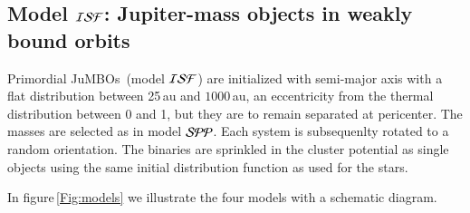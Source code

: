 \documentclass[submission,phys]{lib/SciPost}
\newcommand{\jumbos}{\mbox{JuMBOs}}
\begin{document}
\subsection{Model ${\cal ISF}$: Jupiter-mass objects in weakly bound orbits}

Primordial \jumbos\, (model ${\cal ISF}$) are initialized with
semi-major axis with a flat distribution between 25\,au and
$1000$\,au, an eccentricity from the thermal distribution between 0
and 1, but they are to remain separated at pericenter.  The masses are
selected as in model ${\cal SPP}$.  Each system is subsequenlty
rotated to a random orientation.  The binaries are sprinkled in the
cluster potential as single objects using the same initial
distribution function as used for the stars.


In figure\,\ref{Fig:models} we illustrate the four models with a
schematic diagram.
\end{document}
